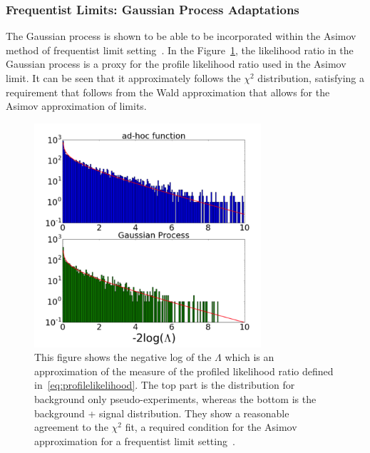 %


\subsubsection{Frequentist Limits: Gaussian Process Adaptations}
    The Gaussian process is shown to be able to be incorporated within the Asimov method of frequentist limit setting~\cite{frate2017modeling}.
    In the Figure~\ref{fig:chi2}, the likelihood ratio in the Gaussian process is a proxy for the profile likelihood ratio used in the Asimov limit. It can be seen that it approximately follows the $\chi^{2}$ distribution, satisfying a requirement that follows from the Wald approximation that allows for the Asimov approximation of limits.

    \begin{figure}[!htb]
        \begin{center}
            \includegraphics[width=0.75\textwidth]{figures/chapter_analysismethod/chi2}
                \caption{
                This figure shows the negative log of the $\Lambda$ which is an approximation of the measure of the profiled likelihood ratio defined in~\ref{eq:profilelikelihood}. The top part is the distribution for background only pseudo-experiments, whereas the bottom is the background + signal distribution. They show a reasonable agreement to the $\chi^{2}$ fit, a required condition for the Asimov approximation for a frequentist limit setting~\cite{frate2017modeling}. 
            }
            \label{fig:chi2}
        \end{center}
    \end{figure}
    \FloatBarrier

